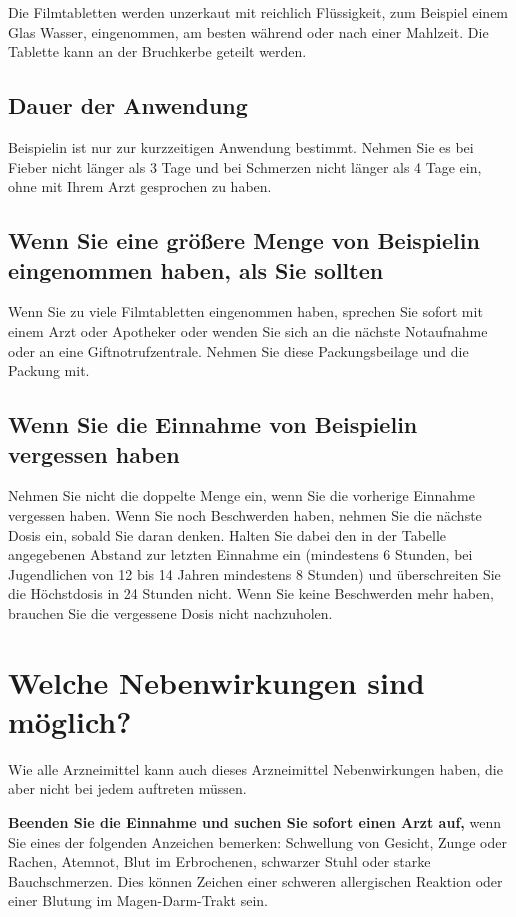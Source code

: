 \documentclass[9.5pt,a4paper]{extarticle}
\newcommand{\wichtig}[1]{\begin{tcolorbox}[colback=pharma!8, colframe=pharma, boxrule=0.6pt, arc=2pt, left=7pt, right=7pt,
  top=4pt, bottom=4pt]#1\end{tcolorbox}}
\begin{document}
Die Filmtabletten werden unzerkaut mit reichlich Flüssigkeit, zum Beispiel einem Glas Wasser, eingenommen, am besten
während oder nach einer Mahlzeit. Die Tablette kann an der Bruchkerbe geteilt werden.

\subsection*{Dauer der Anwendung}
Beispielin ist nur zur kurzzeitigen Anwendung bestimmt. Nehmen Sie es bei Fieber nicht länger als 3 Tage und bei
Schmerzen nicht länger als 4 Tage ein, ohne mit Ihrem Arzt gesprochen zu haben.

\subsection*{Wenn Sie eine größere Menge von Beispielin eingenommen haben, als Sie sollten}
Wenn Sie zu viele Filmtabletten eingenommen haben, sprechen Sie sofort mit einem Arzt oder Apotheker oder wenden
Sie sich an die nächste Notaufnahme oder an eine Giftnotrufzentrale. Nehmen Sie diese Packungsbeilage und die
Packung mit.

\subsection*{Wenn Sie die Einnahme von Beispielin vergessen haben}
Nehmen Sie nicht die doppelte Menge ein, wenn Sie die vorherige Einnahme vergessen haben. Wenn Sie noch
Beschwerden haben, nehmen Sie die nächste Dosis ein, sobald Sie daran denken. Halten Sie dabei den in der
Tabelle angegebenen Abstand zur letzten Einnahme ein (mindestens 6 Stunden, bei Jugendlichen von 12 bis 14
Jahren mindestens 8 Stunden) und überschreiten Sie die Höchstdosis in 24 Stunden nicht. Wenn Sie keine Beschwerden
mehr haben, brauchen Sie die vergessene Dosis nicht nachzuholen.

\section{Welche Nebenwirkungen sind möglich?}
Wie alle Arzneimittel kann auch dieses Arzneimittel Nebenwirkungen haben, die aber nicht bei jedem auftreten müssen.

\wichtig{\textbf{Beenden Sie die Einnahme und suchen Sie sofort einen Arzt auf,} wenn Sie eines der folgenden
Anzeichen bemerken: Schwellung von Gesicht, Zunge oder Rachen, Atemnot, Blut im Erbrochenen, schwarzer Stuhl oder
starke Bauchschmerzen. Dies können Zeichen einer schweren allergischen Reaktion oder einer Blutung im Magen-Darm-Trakt
sein.}
\end{document}
